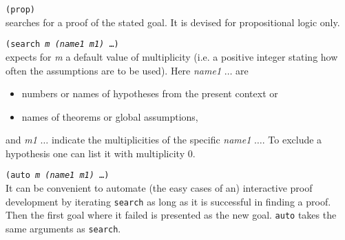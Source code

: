 \documentclass[12pt]{amsart}
\begin{document}
\texttt{(prop)}\\
searches for a proof of the stated goal.  It is devised for
propositional logic only.

\texttt{(search \textsl{m} \textsl{(name1 m1)} \dots)}%
\\
expects for \textsl{m} a default value of multiplicity (i.e. a
positive integer stating how often the assumptions are to be used).
Here \textsl{name1} $\dots$ are
\begin{itemize}
\item numbers or names of hypotheses from the present context or
\item names of theorems or global assumptions,
\end{itemize}
and \textsl{m1} $\dots$ indicate the multiplicities of the specific
\textsl{name1} $\dots$.
To exclude a hypothesis one can list it with multiplicity $0$.

\texttt{(auto \textsl{m} \textsl{(name1 m1)} \dots)}%
\\
It can be convenient to automate (the easy cases of an) interactive
proof development by iterating \texttt{search} as long as it is
successful in finding a proof.  Then the first goal where it failed is
presented as the new goal.  \texttt{auto} takes the same arguments as
\texttt{search}.
\end{document}
